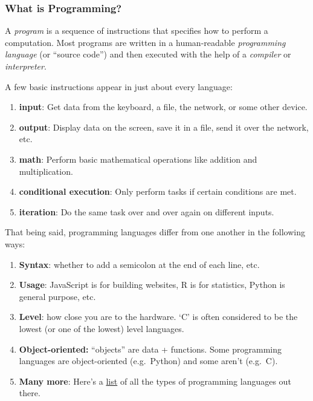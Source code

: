 \documentclass[]{book}
\providecommand{\tightlist}{%
  \setlength{\itemsep}{0pt}\setlength{\parskip}{0pt}}
\begin{document}
\subsubsection*{What is Programming?}\label{what-is-programming}

A \emph{program} is a sequence of instructions that specifies how to
perform a computation. Most programs are written in a human-readable
\emph{programming language} (or ``source code'') and then executed with
the help of a \emph{compiler} or \emph{interpreter}.

A few basic instructions appear in just about every language:

\begin{enumerate}
\def\labelenumi{\arabic{enumi}.}
\tightlist
\item
  \textbf{input}: Get data from the keyboard, a file, the network, or
  some other device.
\item
  \textbf{output}: Display data on the screen, save it in a file, send
  it over the network, etc.
\item
  \textbf{math}: Perform basic mathematical operations like addition and
  multiplication.
\item
  \textbf{conditional execution}: Only perform tasks if certain
  conditions are met.
\item
  \textbf{iteration}: Do the same task over and over again on different
  inputs.
\end{enumerate}

That being said, programming languages differ from one another in the
following ways:

\begin{enumerate}
\def\labelenumi{\arabic{enumi}.}
\tightlist
\item
  \textbf{Syntax}: whether to add a semicolon at the end of each line,
  etc.
\item
  \textbf{Usage}: JavaScript is for building websites, R is for
  statistics, Python is general purpose, etc.
\item
  \textbf{Level}: how close you are to the hardware. `C' is often
  considered to be the lowest (or one of the lowest) level languages.
\item
  \textbf{Object-oriented:} ``objects'' are data + functions. Some
  programming languages are object-oriented (e.g.~Python) and some
  aren't (e.g.~C).
\item
  \textbf{Many more}: Here's a
  \href{https://en.wikipedia.org/wiki/List_of_programming_languages_by_type}{list}
  of all the types of programming languages out there.
\end{enumerate}
\end{document}
